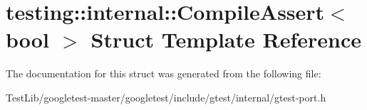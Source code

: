 \hypertarget{structtesting_1_1internal_1_1CompileAssert}{}\section{testing\+:\+:internal\+:\+:Compile\+Assert$<$ bool $>$ Struct Template Reference}
\label{structtesting_1_1internal_1_1CompileAssert}


The documentation for this struct was generated from the following file\+:\begin{DoxyCompactItemize}
\item 
Test\+Lib/googletest-\/master/googletest/include/gtest/internal/gtest-\/port.\+h\end{DoxyCompactItemize}
